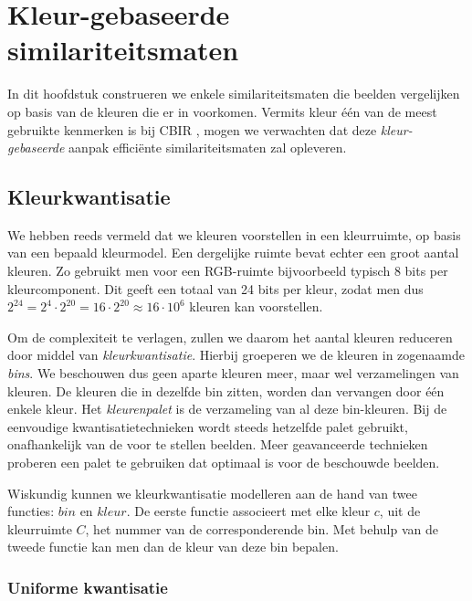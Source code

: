 \chapter{Kleur-gebaseerde similariteitsmaten}

In dit hoofdstuk construeren we enkele similariteitsmaten die beelden vergelijken op
basis van de kleuren die er in voorkomen. Vermits kleur \'e\'en van de meest gebruikte 
kenmerken is bij CBIR \cite{rui:image_retr}, mogen we verwachten dat deze \emph{kleur-gebaseerde}
aanpak effici\"ente similariteitsmaten zal opleveren.




\section{Kleurkwantisatie}
\label{sectie:kleurkwantisatie}

We hebben reeds vermeld dat we kleuren voorstellen in een kleurruimte, op basis van een bepaald
kleurmodel. Een dergelijke ruimte bevat echter een groot aantal kleuren. Zo gebruikt men
voor een RGB-ruimte bijvoorbeeld typisch 8 bits per kleurcomponent. Dit geeft een totaal van
24 bits per kleur, zodat men dus $2^{24}=2^4 \cdot 2^{20}=16 \cdot 2^{20} \approx 16 \cdot 10^6$
kleuren kan voorstellen. 

Om de complexiteit te verlagen, zullen we daarom het aantal kleuren 
reduceren door middel van \emph{kleurkwantisatie}. Hierbij groeperen we de kleuren in 
zogenaamde \emph{bins}. We beschouwen dus geen aparte kleuren meer, maar wel verzamelingen 
van kleuren. De kleuren die in dezelfde bin zitten, worden dan vervangen door \'e\'en enkele
kleur. Het \emph{kleurenpalet} is de verzameling van al deze bin-kleuren.
Bij de eenvoudige kwantisatietechnieken
wordt steeds hetzelfde palet gebruikt, onafhankelijk van de voor te stellen beelden. Meer
geavanceerde technieken proberen een palet te gebruiken dat optimaal is voor de
beschouwde beelden.

Wiskundig kunnen we kleurkwantisatie modelleren aan de hand van twee functies: $bin$ en
$kleur$. De eerste functie associeert met elke kleur $c$, uit de kleurruimte $C$, het
nummer van de corresponderende bin. Met behulp van de tweede functie kan men dan de kleur
van deze bin bepalen.  

\subsection{Uniforme kwantisatie}

